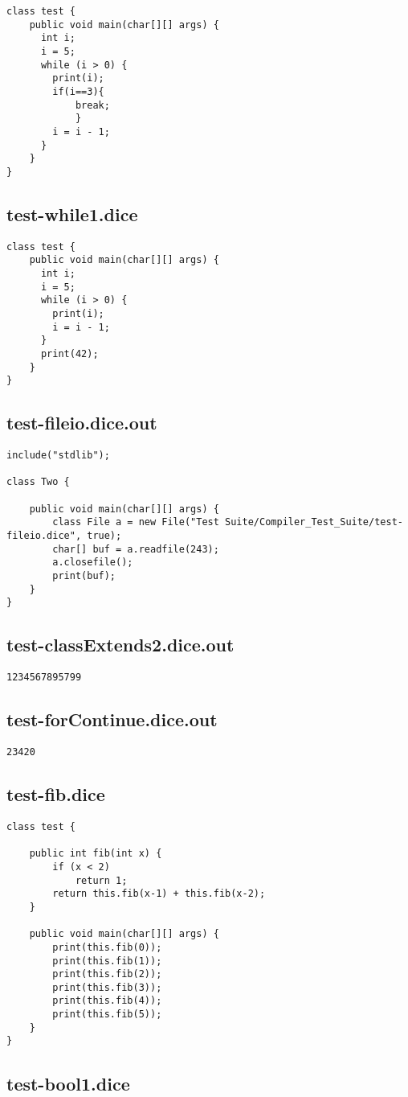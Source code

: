 \begin{verbatim}
class test {
	public void main(char[][] args) {
	  int i;
	  i = 5;
	  while (i > 0) {
	    print(i);
	    if(i==3){
	    	break;
	    	}
	    i = i - 1;
	  }
	}
}
\end{verbatim}\pagebreak\subsection{test-while1.dice}
\begin{verbatim}
class test {
	public void main(char[][] args) {
	  int i;
	  i = 5;
	  while (i > 0) {
	    print(i);
	    i = i - 1;
	  }
	  print(42);
	}
}
\end{verbatim}\pagebreak\subsection{test-fileio.dice.out}
\begin{verbatim}
include("stdlib");

class Two {

	public void main(char[][] args) {
        class File a = new File("Test Suite/Compiler_Test_Suite/test-fileio.dice", true);
        char[] buf = a.readfile(243);
        a.closefile();
        print(buf);
	}
}
\end{verbatim}\pagebreak\subsection{test-classExtends2.dice.out}
\begin{verbatim}
1234567895799
\end{verbatim}\pagebreak\subsection{test-forContinue.dice.out}
\begin{verbatim}
23420
\end{verbatim}\pagebreak\subsection{test-fib.dice}
\begin{verbatim}
class test {
	
	public int fib(int x) {
  		if (x < 2) 
  			return 1;
  		return this.fib(x-1) + this.fib(x-2);
	}

	public void main(char[][] args) {
		print(this.fib(0));
		print(this.fib(1));
		print(this.fib(2));
		print(this.fib(3));
		print(this.fib(4));
		print(this.fib(5));
	}
}
\end{verbatim}\pagebreak\subsection{test-bool1.dice}

